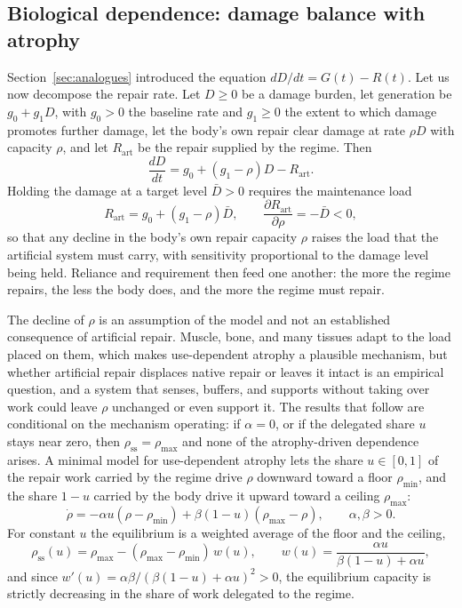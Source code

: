\documentclass[11pt]{article}
\theoremstyle{plain}
\theoremstyle{definition}
\theoremstyle{remark}
\begin{document}
\subsection{Biological dependence: damage balance with atrophy}

Section~\ref{sec:analogues} introduced the equation $dD/dt=G(t)-R(t)$. Let us now decompose the repair rate. Let $D\ge0$ be a damage burden, let generation be $g_0+g_1D$, with $g_0>0$ the baseline rate and $g_1\ge0$ the extent to which damage promotes further damage, let the body's own repair clear damage at rate $\rho D$ with capacity $\rho$, and let $R_{\mathrm{art}}$ be the repair supplied by the regime. Then
\begin{equation}\label{eq:balance}
\frac{dD}{dt}=g_0+(g_1-\rho)D-R_{\mathrm{art}}.
\end{equation}
Holding the damage at a target level $\bar D>0$ requires the maintenance load
\begin{equation}\label{eq:load}
R_{\mathrm{art}}=g_0+(g_1-\rho)\bar D,\qquad \frac{\partial R_{\mathrm{art}}}{\partial\rho}=-\bar D<0,
\end{equation}
so that any decline in the body's own repair capacity $\rho$ raises the load that the artificial system must carry, with sensitivity proportional to the damage level being held. Reliance and requirement then feed one another: the more the regime repairs, the less the body does, and the more the regime must repair.

The decline of $\rho$ is an assumption of the model and not an established consequence of artificial repair. Muscle, bone, and many tissues adapt to the load placed on them, which makes use-dependent atrophy a plausible mechanism, but whether artificial repair displaces native repair or leaves it intact is an empirical question, and a system that senses, buffers, and supports without taking over work could leave $\rho$ unchanged or even support it. The results that follow are conditional on the mechanism operating: if $\alpha=0$, or if the delegated share $u$ stays near zero, then $\rho_{\mathrm{ss}}=\rho_{\max}$ and none of the atrophy-driven dependence arises. A minimal model for use-dependent atrophy lets the share $u\in[0,1]$ of the repair work carried by the regime drive $\rho$ downward toward a floor $\rho_{\min}$, and the share $1-u$ carried by the body drive it upward toward a ceiling $\rho_{\max}$:
\begin{equation}\label{eq:atrophy}
\dot\rho=-\alpha u(\rho-\rho_{\min})+\beta(1-u)(\rho_{\max}-\rho),\qquad \alpha,\beta>0.
\end{equation}
For constant $u$ the equilibrium is a weighted average of the floor and the ceiling,
\begin{equation}\label{eq:rhoss}
\rho_{\mathrm{ss}}(u)=\rho_{\max}-(\rho_{\max}-\rho_{\min})\,w(u),\qquad w(u)=\frac{\alpha u}{\beta(1-u)+\alpha u},
\end{equation}
and since $w'(u)=\alpha\beta/(\beta(1-u)+\alpha u)^2>0$, the equilibrium capacity is strictly decreasing in the share of work delegated to the regime.
\end{document}
